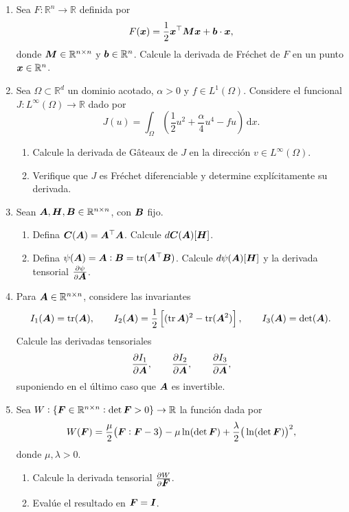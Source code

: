 \documentclass[11pt]{article}
\theoremstyle{thmstyle}
\renewcommand{\pd}[2]{\frac{\partial #1}{ \partial #2}}
\def\vec   #1{\mbox{\boldmath $#1$}{}}
\def\ten   #1{\mbox{\boldmath $#1$}{}}
\DeclareMathOperator{\tr}{tr}
\def\dx{\mbox{\(\,\mathrm{d}x\)}}
\def\R{\mathbb R}
\begin{document}
\begin{enumerate}[label=\textbf{\arabic*.}, leftmargin=*]

    \item Sea $F:\R^n\to\R$ definida por
    \[
    F(\vec x)=\frac{1}{2}\vec x^\top \ten M \vec x+\vec b\cdot \vec x,
    \]
    donde $\ten M\in\R^{n\times n}$ y $\vec b\in\R^n$. Calcule la derivada de Fréchet de $F$ en un punto $\vec x\in\R^n$.

    \item Sea $\Omega\subset\R^d$ un dominio acotado, $\alpha>0$ y $f\in L^1(\Omega)$. Considere el funcional $J:L^\infty(\Omega)\to\R$ dado por
    \[
    J(u)=\int_\Omega\left(\frac{1}{2}u^2+\frac{\alpha}{4}u^4-fu\right)\dx.
    \]
    \begin{enumerate}[label=(\alph*)]
        \item Calcule la derivada de Gâteaux de $J$ en la dirección $v\in L^\infty(\Omega)$.
        \item Verifique que $J$ es Fréchet diferenciable y determine explícitamente su derivada.
    \end{enumerate}

    \item Sean $\ten A,\ten H,\ten B\in\R^{n\times n}$, con $\ten B$ fijo.
    \begin{enumerate}[label=(\alph*)]
        \item Defina $\ten C(\ten A)=\ten A^\top \ten A$. Calcule $d\ten C(\ten A)[\ten H]$.
        \item Defina $\psi(\ten A)=\ten A:\ten B=\tr(\ten A^\top \ten B)$. Calcule $d\psi(\ten A)[\ten H]$ y la derivada tensorial $\pd{\psi}{\ten A}$.
    \end{enumerate}

    \item Para $\ten A\in\R^{n\times n}$, considere las invariantes
    \[
    I_1(\ten A)=\tr(\ten A), \qquad
    I_2(\ten A)=\frac{1}{2}\left[(\tr \ten A)^2-\tr(\ten A^2)\right], \qquad
    I_3(\ten A)=\det(\ten A).
    \]
    Calcule las derivadas tensoriales
    \[
    \pd{I_1}{\ten A},\qquad \pd{I_2}{\ten A},\qquad \pd{I_3}{\ten A},
    \]
    suponiendo en el último caso que $\ten A$ es invertible.

    \item Sea $W:\{\ten F\in\R^{n\times n}:\det\ten F>0\}\to\R$ la función dada por
    \[
    W(\ten F)=\frac{\mu}{2}\big(\ten F:\ten F-3\big)-\mu\ln(\det\ten F)+\frac{\lambda}{2}\big(\ln(\det\ten F)\big)^2,
    \]
    donde $\mu,\lambda>0$.
    \begin{enumerate}[label=(\alph*)]
        \item Calcule la derivada tensorial $\pd{W}{\ten F}$.
        \item Evalúe el resultado en $\ten F=\ten I$.
    \end{enumerate}


\end{enumerate}
\end{document}
